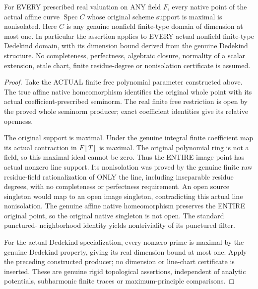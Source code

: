 \begin{theorem}
\label{scheme:actual-integral-curve-closed-nonisolation}
\leanok
{}
For EVERY prescribed real valuation on ANY field $F$, every native
point of the actual affine curve $\operatorname{Spec}C$ whose
original scheme support is maximal is nonisolated. Here $C$ is
any genuine nonfield finite-type domain of dimension at most one.
In particular the assertion applies to EVERY actual nonfield
finite-type Dedekind domain, with its dimension bound derived from
the genuine Dedekind structure. No completeness, perfectness,
algebraic closure, normality of a scalar extension, etale chart,
finite residue-degree or nonisolation certificate is assumed.
\end{theorem}
\begin{proof}
Take the ACTUAL finite free polynomial parameter constructed above.
The true affine native homeomorphism identifies the original whole
point with its actual coefficient-prescribed seminorm. The real
finite free restriction is open by the proved whole seminorm
producer; exact coefficient identities give its relative openness.

The original support is maximal. Under the genuine integral finite
coefficient map its actual contraction in $F[T]$ is maximal.
The original polynomial ring is not a field, so this maximal ideal
cannot be zero. Thus the ENTIRE image point has actual nonzero
line support. Its nonisolation was proved by the genuine finite raw
residue-field rationalization of ONLY the line, including inseparable
residue degrees, with no completeness or perfectness requirement.
An open source singleton would map to an open image singleton,
contradicting this actual line nonisolation. The genuine affine
native homeomorphism preserves the ENTIRE original point, so the
original native singleton is not open. The standard punctured-
neighborhood identity yields nontriviality of its punctured filter.

For the actual Dedekind specialization, every nonzero prime is
maximal by the genuine Dedekind property, giving its real dimension
bound at most one. Apply the preceding constructed producer; no
dimension or line-chart certificate is inserted. These are genuine
rigid topological assertions, independent of analytic potentials,
subharmonic finite traces or maximum-principle comparisons.
\end{proof}
